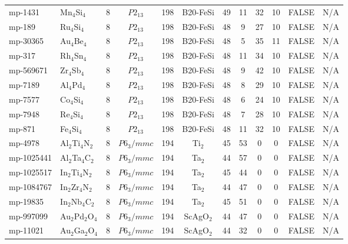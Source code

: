 {\begin{longtable}{llcccccccccc}
    mp-1431 & Mn$_{4}$Si$_{4}$ & 8     & $P2_13$ & 198   & B20-FeSi & 49    & 11    & 32    & 10    & FALSE & N/A \\
    mp-189 & Ru$_{4}$Si$_{4}$ & 8     & $P2_13$ & 198   & B20-FeSi & 48    & 9     & 27    & 10    & FALSE & N/A \\
    mp-30365 & Au$_{4}$Be$_{4}$ & 8     & $P2_13$ & 198   & B20-FeSi & 48    & 5     & 35    & 11    & FALSE & N/A \\
    mp-317 & Rh$_{4}$Sn$_{4}$ & 8     & $P2_13$ & 198   & B20-FeSi & 48    & 11    & 34    & 10    & FALSE & N/A \\
    mp-569671 & Zr$_{4}$Sb$_{4}$ & 8     & $P2_13$ & 198   & B20-FeSi & 48    & 9     & 42    & 10    & FALSE & N/A \\
    mp-7189 & Al$_{4}$Pd$_{4}$ & 8     & $P2_13$ & 198   & B20-FeSi & 48    & 8     & 29    & 10    & FALSE & N/A \\
    mp-7577 & Co$_{4}$Si$_{4}$ & 8     & $P2_13$ & 198   & B20-FeSi & 48    & 6     & 24    & 10    & FALSE & N/A \\
    mp-7948 & Re$_{4}$Si$_{4}$ & 8     & $P2_13$ & 198   & B20-FeSi & 48    & 7     & 28    & 10    & FALSE & N/A \\
    mp-871 & Fe$_{4}$Si$_{4}$ & 8     & $P2_13$ & 198   & B20-FeSi & 48    & 11    & 32    & 10    & FALSE & N/A \\
    mp-4978 & Al$_{2}$Ti$_{4}$N$_{2}$ & 8     & $P6_3/mmc$ & 194   & Ti$_{2}$ & 45    & 53    & 0     & 0     & FALSE & N/A \\
    mp-1025441 & Al$_{2}$Ta$_{4}$C$_{2}$ & 8     & $P6_3/mmc$ & 194   & Ta$_{2}$ & 44    & 57    & 0     & 0     & FALSE & N/A \\
    mp-1025517 & In$_{2}$Ti$_{4}$N$_{2}$ & 8     & $P6_3/mmc$ & 194   & Ta$_{2}$ & 45    & 44    & 0     & 0     & FALSE & N/A \\
    mp-1084767 & In$_{2}$Zr$_{4}$N$_{2}$ & 8     & $P6_3/mmc$ & 194   & Ta$_{2}$ & 44    & 47    & 0     & 0     & FALSE & N/A \\
    mp-19835 & In$_{2}$Nb$_{4}$C$_{2}$ & 8     & $P6_3/mmc$ & 194   & Ta$_{2}$ & 45    & 51    & 0     & 0     & FALSE & N/A \\
    mp-997099 & Au$_{2}$Pd$_{2}$O$_{4}$ & 8     & $P6_3/mmc$ & 194   & ScAgO$_{2}$ & 44    & 47    & 0     & 0     & FALSE & N/A \\
    mp-11021 & Au$_{2}$Ga$_{2}$O$_{4}$ & 8     & $P6_3/mmc$ & 194   & ScAgO$_{2}$ & 44    & 32    & 0     & 0     & FALSE & N/A \\

\end{longtable}}
